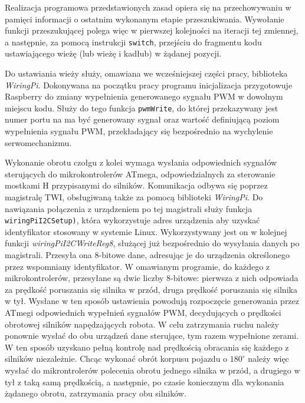 Realizacja programowa przedstawionych zasad opiera się na przechowywaniu w pamięci informacji o ostatnim wykonanym etapie przeszukiwania. Wywołanie funkcji przeszukującej polega więc w pierwszej kolejności na iteracji tej zmiennej, a następnie, za pomocą instrukcji \texttt{switch}, przejściu do fragmentu kodu ustawiającego wieżę (lub wieżę i kadłub) w żądanej pozycji.

Do ustawiania wieży służy, omawiana we wcześniejszej części pracy, biblioteka \textit{WiringPi}. Dokonywana na początku pracy programu inicjalizacja przygotowuje Raspberry do zmiany wypełnienia generowanego sygnału PWM w dowolnym miejscu kodu.  Służy do tego funkcja \texttt{pwmWrite}, do której przekazywany jest numer portu na ma być generowany sygnał oraz wartość definiującą poziom wypełnienia sygnału PWM, przekładający się bezpośrednio na wychylenie serwomechanizmu.

Wykonanie obrotu czołgu z kolei wymaga wysłania odpowiednich sygnałów sterujących do mikrokontrolerów ATmega, odpowiedzialnych za sterowanie mostkami H przypisanymi do silników. Komunikacja odbywa się poprzez magistralę TWI, obsługiwaną także za pomocą biblioteki \textit{WiringPi}. Do nawiązania połączenia z urządzeniem po tej magistrali służy funkcja \texttt{wiringPiI2CSetup)}, która wykorzystuje adres urządzenia aby uzyskać identyfikator stosowany w systemie Linux. Wykorzystywany jest on w kolejnej funkcji \textit{wiringPiI2CWriteReg8}, służącej już bezpośrednio do wysyłania danych po magistrali. Przesyła ona 8-bitowe dane, adresując je do urządzenia określonego przez wspomniany identyfikator. W omawianym programie, do każdego z mikrokontrolerów, przesyłane są dwie liczby 8-bitowe: pierwsza z nich odpowiada za prędkość poruszania się silnika w przód, druga prędkość poruszania się silnika w tył. Wysłane w ten sposób ustawienia powodują rozpoczęcie generowania przez ATmegi odpowiednich wypełnień sygnałów PWM, decydujących o prędkości obrotowej silników napędzających robota. W celu zatrzymania ruchu należy ponownie wysłać do obu urządzeń dane sterujące, tym razem wypełnione zerami. W ten sposób uzyskano pełną kontrolę nad prędkością obracania się każdego z silników niezależnie. Chcąc wykonać obrót korpusu pojazdu o $180^\circ$ należy więc wysłać do mikrontrolerów polecenia obrotu jednego silnika w przód, a drugiego w tył z taką samą prędkością, a następnie, po czasie koniecznym dla wykonania żądanego obrotu, zatrzymania pracy obu silników.

